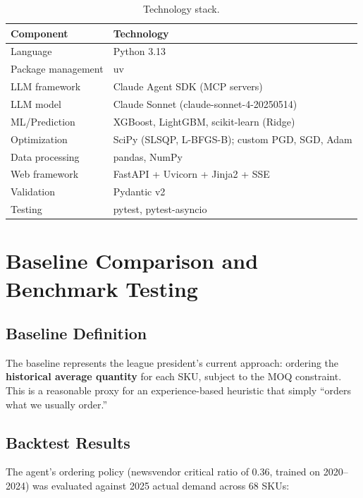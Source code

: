 \documentclass[11pt, letterpaper]{article}
\begin{document}
\begin{table}[H]
\centering
\caption{Technology stack.}
\label{tab:tech-stack}
\begin{tabular}{@{}ll@{}}
\toprule
\textbf{Component} & \textbf{Technology} \\
\midrule
Language & Python 3.13 \\
Package management & uv \\
LLM framework & Claude Agent SDK (MCP servers) \\
LLM model & Claude Sonnet (claude-sonnet-4-20250514) \\
ML/Prediction & XGBoost, LightGBM, scikit-learn (Ridge) \\
Optimization & SciPy (SLSQP, L-BFGS-B); custom PGD, SGD, Adam \\
Data processing & pandas, NumPy \\
Web framework & FastAPI + Uvicorn + Jinja2 + SSE \\
Validation & Pydantic v2 \\
Testing & pytest, pytest-asyncio \\
\bottomrule
\end{tabular}
\end{table}

\section{Baseline Comparison and Benchmark Testing}

\subsection{Baseline Definition}

The baseline represents the league president's current approach: ordering the \textbf{historical average quantity} for each SKU, subject to the MOQ constraint. This is a reasonable proxy for an experience-based heuristic that simply ``orders what we usually order.''

\subsection{Backtest Results}

The agent's ordering policy (newsvendor critical ratio of 0.36, trained on 2020--2024) was evaluated against 2025 actual demand across 68 SKUs:
\end{document}
